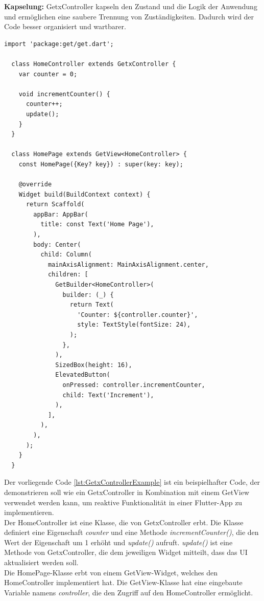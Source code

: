 \textbf{Kapselung:}
GetxController kapseln den Zustand und die Logik der Anwendung und ermöglichen eine saubere Trennung von Zuständigkeiten. Dadurch wird der Code besser organisiert und wartbarer.
\\
\begin{lstlisting}[caption=Beispiel zum Einsatz von einem GetxController in Kombination mit GetView,label=lst:GetxControllerExample]
  import 'package:get/get.dart';

  class HomeController extends GetxController {
    var counter = 0;

    void incrementCounter() {
      counter++;
      update();
    }
  }

  class HomePage extends GetView<HomeController> {
    const HomePage({Key? key}) : super(key: key);

    @override
    Widget build(BuildContext context) {
      return Scaffold(
        appBar: AppBar(
          title: const Text('Home Page'),
        ),
        body: Center(
          child: Column(
            mainAxisAlignment: MainAxisAlignment.center,
            children: [
              GetBuilder<HomeController>(
                builder: (_) {
                  return Text(
                    'Counter: ${controller.counter}',
                    style: TextStyle(fontSize: 24),
                  );
                },
              ),
              SizedBox(height: 16),
              ElevatedButton(
                onPressed: controller.incrementCounter,
                child: Text('Increment'),
              ),
            ],
          ),
        ),
      );
    }
  }
\end{lstlisting}
Der vorliegende Code \ref{lst:GetxControllerExample} ist ein beispielhafter Code, der demonstrieren soll wie ein GetxController in Kombination mit einem GetView verwendet werden kann, um reaktive Funktionalität in einer Flutter-App zu implementieren.
\\
Der HomeController ist eine Klasse, die von GetxController erbt. Die Klasse definiert eine Eigenschaft \textit{counter} und eine Methode \textit{incrementCounter()}, die den Wert der Eigenschaft um 1 erhöht und \textit{update()} aufruft. \textit{update()} ist eine Methode von GetxController, die dem jeweiligen Widget mitteilt, dass das UI aktualisiert werden soll.
\\
Die HomePage-Klasse erbt von einem GetView-Widget, welches den HomeController implementiert hat. Die GetView-Klasse hat eine eingebaute Variable namens \textit{controller}, die den Zugriff auf den HomeController ermöglicht.


